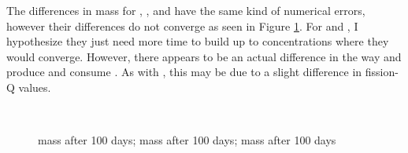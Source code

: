 The differences in mass for , , and  have the same kind of numerical errors, however
their differences do not converge as seen in Figure \ref{fig:am-cm-mass-eol}.
For  and , I hypothesize they just need more time to build up to
concentrations where they would converge. However, there appears to be an actual difference
in the way \OpenMC and \SerpentTWO produce and consume . As with
, this may be due to a slight difference in fission-Q values.

\begin{figure}[htpb]
    \centering
    \\
    \caption[, , and  mass after to 100 days]{
      mass after 100 days;
      mass after 100 days;
      mass after 100 days}
    \label{fig:am-cm-mass-eol}
\end{figure}


